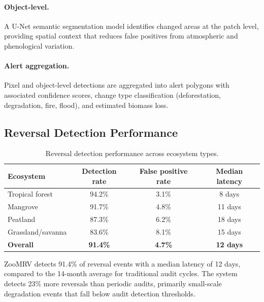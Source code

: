 \paragraph{Object-level.} A U-Net semantic segmentation model
identifies changed areas at the patch level, providing spatial context
that reduces false positives from atmospheric and phenological variation.

\paragraph{Alert aggregation.} Pixel and object-level detections are
aggregated into alert polygons with associated confidence scores,
change type classification (deforestation, degradation, fire, flood),
and estimated biomass loss.

\subsection{Reversal Detection Performance}

\begin{table}[H]
\centering
\caption{Reversal detection performance across ecosystem types.}
\label{tab:reversals}
\begin{tabular}{lccc}
\toprule
\textbf{Ecosystem} & \textbf{Detection rate} &
  \textbf{False positive rate} & \textbf{Median latency} \\
\midrule
Tropical forest & 94.2\% & 3.1\% & 8 days \\
Mangrove & 91.7\% & 4.8\% & 11 days \\
Peatland & 87.3\% & 6.2\% & 18 days \\
Grassland/savanna & 83.6\% & 8.1\% & 15 days \\
\midrule
\textbf{Overall} & \textbf{91.4\%} & \textbf{4.7\%} &
  \textbf{12 days} \\
\bottomrule
\end{tabular}
\end{table}

ZooMRV detects 91.4\% of reversal events with a median latency of 12
days, compared to the 14-month average for traditional audit cycles.
The system detects 23\% more reversals than periodic audits, primarily
small-scale degradation events that fall below audit detection
thresholds.


